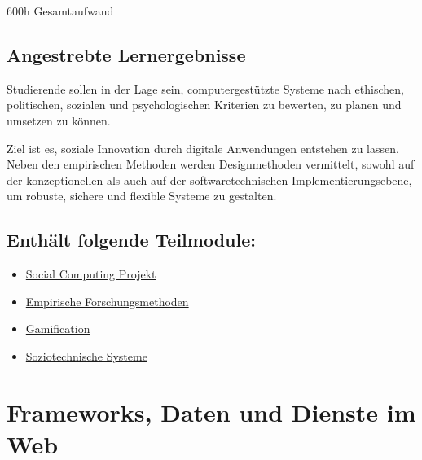 600h Gesamtaufwand

\hypertarget{angestrebte-lernergebnissepathlabelmi-2017modulbeschreibungen-bachelorba_vertiefung_socialcomputing}{%
\section*{Angestrebte
Lernergebnisse\label{/mi-2017/modulbeschreibungen-bachelor/BA_Vertiefung_SocialComputing}}\label{angestrebte-lernergebnissepathlabelmi-2017modulbeschreibungen-bachelorba_vertiefung_socialcomputing}}

Studierende sollen in der Lage sein, computergestützte Systeme nach
ethischen, politischen, sozialen und psychologischen Kriterien zu
bewerten, zu planen und umsetzen zu können.

Ziel ist es, soziale Innovation durch digitale Anwendungen entstehen zu
lassen. Neben den empirischen Methoden werden Designmethoden vermittelt,
sowohl auf der konzeptionellen als auch auf der softwaretechnischen
Implementierungsebene, um robuste, sichere und flexible Systeme zu
gestalten.

\hypertarget{enthuxe4lt-folgende-teilmodulepathlabelmi-2017modulbeschreibungen-bachelorba_vertiefung_socialcomputing}{%
\section*{Enthält folgende
Teilmodule:\label{/mi-2017/modulbeschreibungen-bachelor/BA_Vertiefung_SocialComputing}}\label{enthuxe4lt-folgende-teilmodulepathlabelmi-2017modulbeschreibungen-bachelorba_vertiefung_socialcomputing}}

\begin{itemize}
\tightlist
\item
  \hyperref[/mi-2017/modulbeschreibungen-bachelor/BA_SC_Projekt]{Social Computing Projekt}
\item
  \hyperref[/mi-2017/modulbeschreibungen-bachelor/BA_SC_empirische-forschungsmethoden]{Empirische Forschungsmethoden}
\item
  \hyperref[/mi-2017/modulbeschreibungen-bachelor/BA_SC_gamification]{Gamification}
\item
  \hyperref[/mi-2017/modulbeschreibungen-bachelor/BA_SC_soziotechnische-systeme]{Soziotechnische Systeme}
\end{itemize}

\hypertarget{frameworks-daten-und-dienste-im-webpathlabelmi-2017modulbeschreibungen-bachelorba_wd_frameworks-daten-und-dienste}{%
\chapter{Frameworks, Daten und Dienste im
Web\label{/mi-2017/modulbeschreibungen-bachelor/BA_WD_Frameworks-daten-und-dienste}}\label{frameworks-daten-und-dienste-im-webpathlabelmi-2017modulbeschreibungen-bachelorba_wd_frameworks-daten-und-dienste}}

